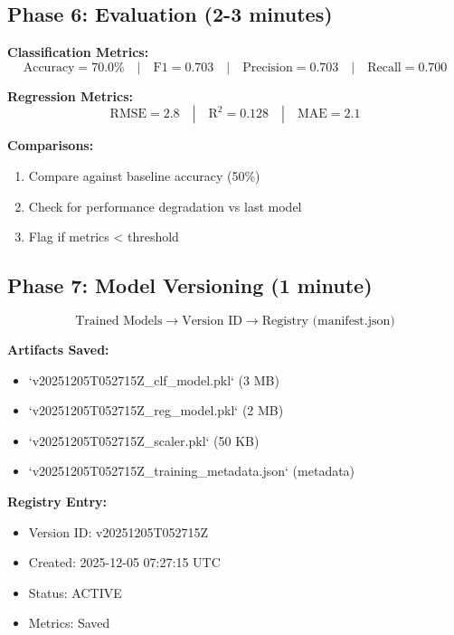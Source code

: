\subsection{Phase 6: Evaluation (2-3 minutes)}

\textbf{Classification Metrics:}
\begin{equation}
\text{Accuracy} = 70.0\% \quad | \quad \text{F1} = 0.703 \quad | \quad \text{Precision} = 0.703 \quad | \quad \text{Recall} = 0.700
\end{equation}

\textbf{Regression Metrics:}
\begin{equation}
\text{RMSE} = 2.8 \quad | \quad \text{R}^2 = 0.128 \quad | \quad \text{MAE} = 2.1
\end{equation}

\textbf{Comparisons:}
\begin{enumerate}
    \item Compare against baseline accuracy (50\%)
    \item Check for performance degradation vs last model
    \item Flag if metrics < threshold
\end{enumerate}

\subsection{Phase 7: Model Versioning (1 minute)}

\begin{equation}
\text{Trained Models} \rightarrow \text{Version ID} \rightarrow \text{Registry (manifest.json)}
\end{equation}

\textbf{Artifacts Saved:}
\begin{itemize}
    \item `v20251205T052715Z_clf_model.pkl` (3 MB)
    \item `v20251205T052715Z_reg_model.pkl` (2 MB)
    \item `v20251205T052715Z_scaler.pkl` (50 KB)
    \item `v20251205T052715Z_training_metadata.json` (metadata)
\end{itemize}

\textbf{Registry Entry:}
\begin{itemize}
    \item Version ID: v20251205T052715Z
    \item Created: 2025-12-05 07:27:15 UTC
    \item Status: ACTIVE
    \item Metrics: Saved
\end{itemize}

